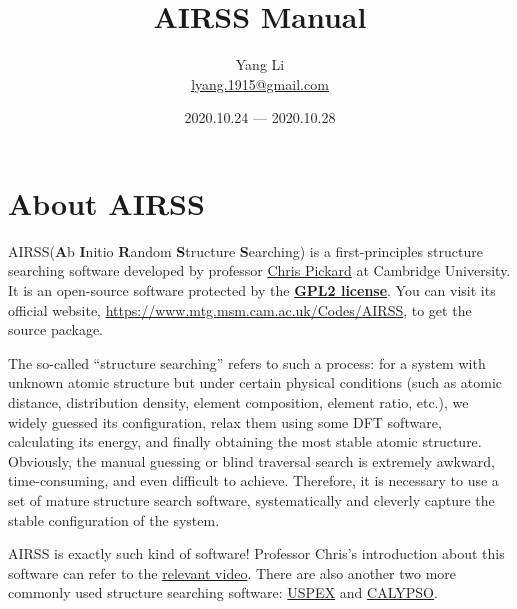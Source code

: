 \documentclass[a4paper, 10pt]{article}
\title{\textbf{AIRSS Manual}}
\author{Yang Li\\ \href{mailto:lyang.1915@gmail.com}{lyang.1915@gmail.com}}
\date{2020.10.24 --- 2020.10.28}
\begin{document}
\maketitle
\tableofcontents

\newpage
\section{About AIRSS}
AIRSS(\textbf{A}b \textbf{I}nitio \textbf{R}andom \textbf{S}tructure \textbf{S}earching) is a first-principles structure searching software developed by professor \href{https://www.mtg.msm.cam.ac.uk/People/CJP}{Chris Pickard} at Cambridge University. It is an open-source software protected by the \href{https://en.wikipedia.org/wiki/GNU_General_Public_License}{\textbf{GPL2 license}}. You can visit its official website, \url{https://www.mtg.msm.cam.ac.uk/Codes/AIRSS}, to get the source package. 

The so-called ``structure searching'' refers to such a process: for a system with unknown atomic structure but under certain physical conditions (such as atomic distance, distribution density, element composition, element ratio, etc.), we widely guessed its configuration, relax them using some DFT software, calculating its energy, and finally obtaining the most stable atomic structure. Obviously, the manual guessing or blind traversal search is extremely awkward, time-consuming, and even difficult to achieve. Therefore, it is necessary to use a set of mature structure search software, systematically and cleverly capture the stable configuration of the system.

AIRSS is exactly such kind of software! Professor Chris's introduction about this software can refer to the \href{https://www.youtube.com/watch?v=xW6pOYEIKVs&t=1061s}{relevant video}. There are also another two more commonly used structure searching software: \href{http://uspex.stonybrook.edu/uspex.html}{USPEX} and \href{http://www.calypso.cn}{CALYPSO}.
\end{document}
